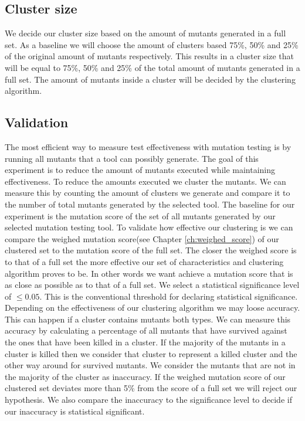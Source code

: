 \documentclass[../../main]{subfiles}
\begin{document}
\subsection{Cluster size}
We decide our cluster size based on the amount of mutants generated in a full set.
As a baseline we will choose the amount of clusters based 75\%, 50\% and 25\% of the original amount of mutants respectively.
This results in a cluster size that will be equal to 75\%, 50\% and 25\% of the total amount of mutants generated in a full set.
The amount of mutants inside a cluster will be decided by the clustering algorithm.

\subsection{Validation}
\label{ch:exp1_validation}
The most efficient way to measure test effectiveness with mutation testing is by running all mutants that a tool can possibly generate.
The goal of this experiment is to reduce the amount of mutants executed while maintaining effectiveness.
To reduce the amounts executed we cluster the mutants. 
We can measure this by counting the amount of clusters we generate and compare it to the number of total mutants generated by the selected tool.
\newline
The baseline for our experiment is the mutation score of the set of all mutants generated by our selected mutation testing tool.
\newline
To validate how effective our clustering is we can compare the weighed mutation score(see Chapter \ref{ch:weighed_score}) of our clustered set to the mutation score of the full set.
The closer the weighed score is to that of a full set the more effective our set of characteristics and clustering algorithm proves to be.
In other words we want achieve a mutation score that is as close as possible as to that of a full set.
We select a statistical significance level of $\leq 0.05$.
This is the conventional threshold for declaring statistical significance\cite{Kirk1996PracticalCome}.
\newline
Depending on the effectiveness of our clustering algorithm we may loose accuracy.
This can happen if a cluster contains mutants both types. 
We can measure this accuracy by calculating a percentage of all mutants that have survived against the ones that have been killed in a cluster.
If the majority of the mutants in a cluster is killed then we consider that cluster to represent a killed cluster and the other way around for survived mutants.
We consider the mutants that are not in the majority of the cluster as inaccuracy.
\newline
If the weighed mutation score of our clustered set deviates more than 5\% from the score of a full set we will reject our hypothesis.
We also compare the inaccuracy to the significance level to decide if our inaccuracy is statistical significant.
\end{document}
